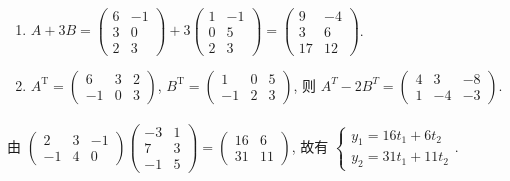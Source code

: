 	 \paragraph{} %
		 \begin{enumerate}
			 \item %
			       $A + 3B =
				       \begin{pmatrix}
					       6 & -1 \\
					       3 & 0  \\
					       2 & 3
				       \end{pmatrix} + 3
				       \begin{pmatrix}
					       1 & -1 \\
					       0 & 5  \\
					       2 & 3
				       \end{pmatrix} =
				       \begin{pmatrix}
					       9  & -4 \\
					       3  & 6  \\
					       17 & 12
				       \end{pmatrix}$.

			 \item %
			       $A^{\mathrm{T}} =
				       \begin{pmatrix}
					       6  & 3 & 2 \\
					       -1 & 0 & 3
				       \end{pmatrix}$,
			       $B^{\mathrm{T}} =
				       \begin{pmatrix}
					       1  & 0 & 5 \\
					       -1 & 2 & 3
				       \end{pmatrix}$,
			       则
			       $A^{T} - 2B^{T} =
				       \begin{pmatrix}
					       4 & 3  & -8 \\
					       1 & -4 & -3
				       \end{pmatrix}.$
		 \end{enumerate}


	 \paragraph{} %
		 由
		 $\begin{pmatrix}
				 2  & 3 & -1 \\
				 -1 & 4 & 0
			 \end{pmatrix}
			 \begin{pmatrix}
				 -3 & 1 \\
				 7  & 3 \\
				 -1 & 5
			 \end{pmatrix} = \begin{pmatrix}
				 16 & 6  \\
				 31 & 11
			 \end{pmatrix}$,
		 故有
		 $\begin{cases}
				 y_1 = 16t_1 + 6t_2 \\
				 y_2 = 31t_1 + 11t_2
			 \end{cases}$.


